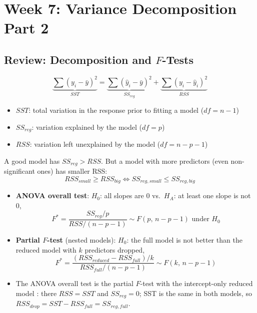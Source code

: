 
\section{Week 7: Variance Decomposition Part 2}

\subsection{Review: Decomposition and $F$-Tests}

\begin{remark}
    \[\underbrace{\sum(y_i-\bar y)^2}_{SST}=\underbrace{\sum(\hat y_i-\bar y)^2}_{SS_{reg}}+\underbrace{\sum(y_i-\hat y_i)^2}_{RSS}\]
    \begin{itemize}
        \item $SST$: total variation in the response prior to fitting a model ($df=n-1$)
        \item $SS_{reg}$: variation explained by the model ($df=p$)
        \item $RSS$: variation left unexplained by the model ($df=n-p-1$)
    \end{itemize}
    A good model has $SS_{reg}>RSS$. But a model with more predictors (even non-significant
    ones) has smaller RSS:
    \[RSS_{small}\geq RSS_{big}\iff SS_{reg,small}\leq SS_{reg,big}\]
\end{remark}

\begin{remark}
    \begin{itemize}
        \item \textbf{ANOVA overall test}: $H_0$: all slopes are 0 vs.\ $H_A$: at least one slope is not 0,
        \[F^*=\frac{SS_{reg}/p}{RSS/(n-p-1)}\sim F(p,\,n-p-1)\text{ under }H_0\]
        \item \textbf{Partial $F$-test} (nested models): $H_0$: the full model is not better than
        the reduced model with $k$ predictors dropped,
        \[F^*=\frac{(RSS_{reduced}-RSS_{full})/k}{RSS_{full}/(n-p-1)}\sim F(k,\,n-p-1)\]
        \item The ANOVA overall test is the partial $F$-test with the intercept-only reduced model
        : there $RSS=SST$ and $SS_{reg}=0$; SST is the
        same in both models, so $RSS_{drop}=SST-RSS_{full}=SS_{reg,full}$.
    \end{itemize}
\end{remark}


